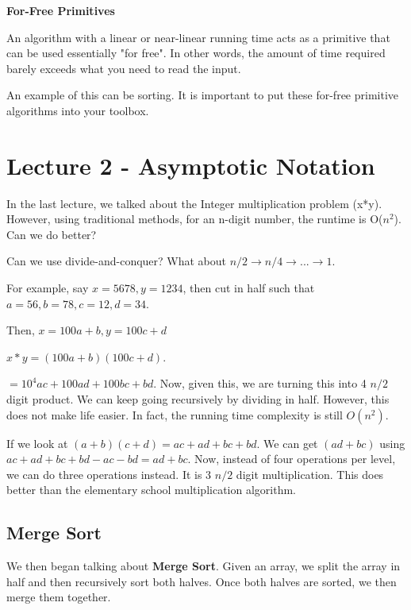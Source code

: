\documentclass[11pt]{article}
\begin{document}
\vspace{11pt}
\textbf{For-Free Primitives}
\vspace{11pt}

An algorithm with a linear or near-linear running time acts as a primitive that can be used essentially "for free". In other words, the amount of time required barely exceeds what you need to read the input.

An example of this can be sorting. It is important to put these for-free primitive algorithms into your toolbox.

\newpage
\section{Lecture 2 - Asymptotic Notation}
\vspace{11pt}

In the last lecture, we talked about the Integer multiplication problem (x*y). However, using traditional methods, for an n-digit number, the runtime is O($n^2$). Can we do better?

Can we use divide-and-conquer? What about $n/2 \to n/4 \to ...\to 1$.

For example, say $x=5678, y=1234$, then cut in half such that $a=56,b=78,c=12,d=34$.

Then, $x=100a+b, y=100c+d$

$x*y=(100a+b)(100c+d)$.

$= 10^4ac + 100ad + 100bc + bd$. Now, given this, we are turning this into 4 $n/2$ digit product. We can keep going recursively by dividing in half. However, this does not make life easier. In fact, the running time complexity is still $O(n^2)$.

If we look at $(a+b)(c+d)=ac+ad+bc+bd$. We can get $(ad+bc)$ using $ac+ad+bc+bd - ac - bd = ad+bc$. Now, instead of four operations per level, we can do three operations instead. It is 3 $n/2$ digit multiplication. This does better than the elementary school multiplication algorithm.

\vspace{11pt}
\subsection{Merge Sort}
\vspace{11pt}

We then began talking about \textbf{Merge Sort}. Given an array, we split the array in half and then recursively sort both halves. Once both halves are sorted, we then merge them together.
\end{document}
